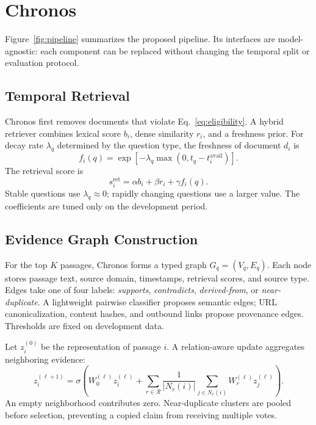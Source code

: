 \section{Chronos}
\label{sec:method}

Figure~\ref{fig:pipeline} summarizes the proposed pipeline.  Its interfaces are
model-agnostic: each component can be replaced without changing the temporal
split or evaluation protocol.

\subsection{Temporal Retrieval}

Chronos first removes documents that violate Eq.~\eqref{eq:eligibility}.  A
hybrid retriever combines lexical score $b_i$, dense similarity $r_i$, and a
freshness prior.  For decay rate $\lambda_q$ determined by the question type,
the freshness of document $d_i$ is
\begin{equation}
  f_i(q)=\exp\!\left[-\lambda_q
  \max\left(0,t_q-t_i^{\mathrm{avail}}\right)\right].
  \label{eq:freshness}
\end{equation}
The retrieval score is
\begin{equation}
  s_i^{\mathrm{ret}} = \alpha b_i + \beta r_i + \gamma f_i(q).
  \label{eq:retrieval}
\end{equation}
Stable questions use $\lambda_q\approx0$; rapidly changing questions use a
larger value.  The coefficients are tuned only on the development period.

\subsection{Evidence Graph Construction}

For the top $K$ passages, Chronos forms a typed graph
$G_q=(V_q,E_q)$.  Each node stores passage text, source domain, timestamps,
retrieval scores, and source type.  Edges take one of four labels:
\emph{supports}, \emph{contradicts}, \emph{derived-from}, or
\emph{near-duplicate}.  A lightweight pairwise classifier proposes semantic
edges; URL canonicalization, content hashes, and outbound links propose
provenance edges.  Thresholds are fixed on development data.

Let $z_i^{(0)}$ be the representation of passage $i$.  A relation-aware update
aggregates neighboring evidence:
\begin{equation}
 z_i^{(\ell+1)} = \sigma\!\left(W_0^{(\ell)}z_i^{(\ell)}+
 \sum_{r\in\mathcal{R}}\frac{1}{|N_r(i)|}
 \sum_{j\in N_r(i)}W_r^{(\ell)}z_j^{(\ell)}\right).
 \label{eq:message}
\end{equation}
An empty neighborhood contributes zero.  Near-duplicate clusters are pooled
before selection, preventing a copied claim from receiving multiple votes.

